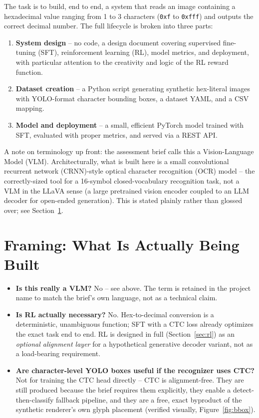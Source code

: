 \documentclass[11pt]{article}
\begin{document}
The task is to build, end to end, a system that reads an image containing a hexadecimal
value ranging from 1 to 3 characters (\texttt{0xf} to \texttt{0xfff}) and outputs the
correct decimal number. The full lifecycle is broken into three parts:

\begin{enumerate}[label=\textbf{Part \Alph*.}]
    \item \textbf{System design} -- no code, a design document covering supervised
    fine-tuning (SFT), reinforcement learning (RL), model metrics, and deployment, with
    particular attention to the creativity and logic of the RL reward function.
    \item \textbf{Dataset creation} -- a Python script generating synthetic hex-literal
    images with YOLO-format character bounding boxes, a dataset YAML, and a CSV mapping.
    \item \textbf{Model and deployment} -- a small, efficient PyTorch model trained with
    SFT, evaluated with proper metrics, and served via a REST API.
\end{enumerate}

A note on terminology up front: the assessment brief calls this a Vision-Language Model
(VLM). Architecturally, what is built here is a small convolutional recurrent network
(CRNN)-style optical character recognition (OCR) model -- the correctly-sized tool for a
16-symbol closed-vocabulary recognition task, not a VLM in the LLaVA sense (a large
pretrained vision encoder coupled to an LLM decoder for open-ended generation). This is
stated plainly rather than glossed over; see Section~\ref{sec:framing}.

\section{Framing: What Is Actually Being Built}
\label{sec:framing}

\begin{itemize}
    \item \textbf{Is this really a VLM?} No -- see above. The term is retained in the
    project name to match the brief's own language, not as a technical claim.
    \item \textbf{Is RL actually necessary?} No. Hex-to-decimal conversion is a
    deterministic, unambiguous function; SFT with a CTC loss already optimizes the exact
    task end to end. RL is designed in full (Section~\ref{sec:rl}) as an
    \emph{optional alignment layer} for a hypothetical generative decoder variant, not as
    a load-bearing requirement.
    \item \textbf{Are character-level YOLO boxes useful if the recognizer uses CTC?} Not
    for training the CTC head directly -- CTC is alignment-free. They are still produced
    because the brief requires them explicitly, they enable a detect-then-classify
    fallback pipeline, and they are a free, exact byproduct of the synthetic renderer's
    own glyph placement (verified visually, Figure~\ref{fig:bbox}).
\end{itemize}
\end{document}
